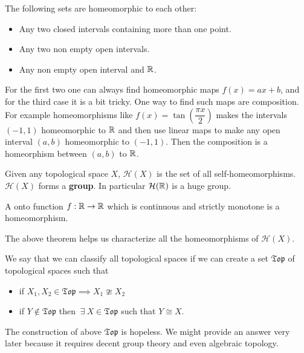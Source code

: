 \documentclass{scrartcl} %
\begin{document}
\begin{example}
The following sets are homeomorphic to each other:
\begin{itemize}
	\item Any two closed intervals containing more
		than one point.
	\item Any two non empty open intervals.
	\item Any non empty open interval and $\mathbb R$.
\end{itemize}
For the first two one can always find homeomorphic maps
$f(x) = ax + b$, and for the third case it is a bit
tricky. One way to find such maps are composition. For
example homeomorphisms like $f(x) = 
\tan\left(\dfrac{\pi x}{2}\right)$ makes the intervals
$(-1,1)$ homeomorphic to $\mathbb R$ and then use linear 
maps to make any open interval $(a,b)$ homeomorphic to 
$(-1,1)$. Then the composition is a homeorphism between
$(a,b)$ to $\mathbb R$.
\end{example}
\begin{example}
	Given any topological space $X$, $\mathcal{H}(X)$
	is the set of all self-homeomorphisms.\\
	$\mathcal{H}(X)$ forms a \textbf{group}. In 
	particular $\mathcal{H}(\mathbb R)$ is a huge group.
\end{example}
\begin{lemma}
A onto function $f : \mathbb R \rightarrow \mathbb R$ which is 
continuous and strictly monotone is a homeomorphism.
\end{lemma}
\begin{remark}
	The above theorem helps us characterize all the
	homeomorphisms of $\mathcal{H}(X)$.
\end{remark}
\begin{definition}
	We say that we can classify all topological spaces if we can create a set $\mathfrak{Top}$ of topological
	spaces such that
	\begin{itemize}
		\item if $X_1, X_2 \in \mathfrak{Top} \implies X_1 \ncong X_2$ 
		\item if $Y \notin \mathfrak{Top}$ then $\ \exists \ X \in \mathfrak{Top}$ such that
			$Y \cong X$.
	\end{itemize}
\end{definition}
\begin{remark}
	The construction of above $\mathfrak{Top}$ is hopeless. We might provide an answer very later because it 
	requires  decent group theory and even algebraic topology.
\end{remark}
\end{document}

